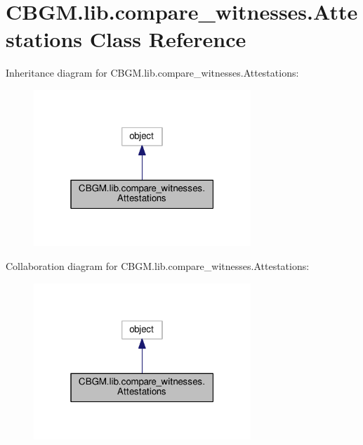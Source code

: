 \hypertarget{classCBGM_1_1lib_1_1compare__witnesses_1_1Attestations}{}\section{C\+B\+G\+M.\+lib.\+compare\+\_\+witnesses.\+Attestations Class Reference}
\label{classCBGM_1_1lib_1_1compare__witnesses_1_1Attestations}


Inheritance diagram for C\+B\+G\+M.\+lib.\+compare\+\_\+witnesses.\+Attestations\+:\nopagebreak
\begin{figure}[H]
\begin{center}
\leavevmode
\includegraphics[width=232pt]{classCBGM_1_1lib_1_1compare__witnesses_1_1Attestations__inherit__graph}
\end{center}
\end{figure}


Collaboration diagram for C\+B\+G\+M.\+lib.\+compare\+\_\+witnesses.\+Attestations\+:\nopagebreak
\begin{figure}[H]
\begin{center}
\leavevmode
\includegraphics[width=232pt]{classCBGM_1_1lib_1_1compare__witnesses_1_1Attestations__coll__graph}
\end{center}
\end{figure}
